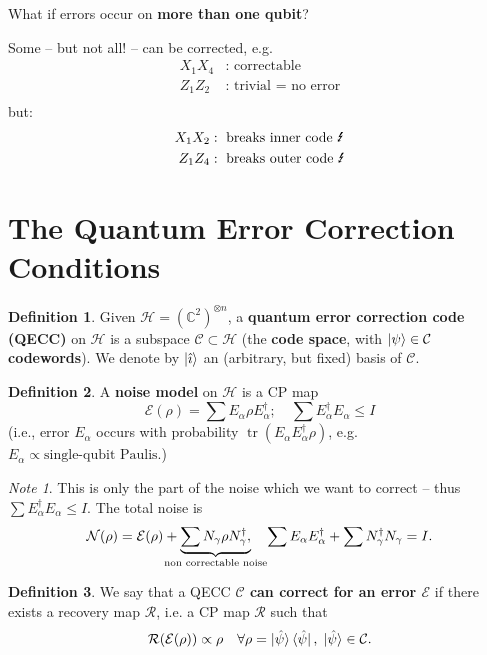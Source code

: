 \documentclass[a4paper, 12pt]{article}
\theoremstyle{plain}
\theoremstyle{definition}
\newtheorem*{definition}{Definition}
\theoremstyle{remark}
\newtheorem*{note}{Note}
\renewcommand{\H}{\mathcal{H}}
\newcommand{\C}{\mathbb{C}}
\DeclareMathOperator{\tr}{tr}
\begin{document}
What if errors occur on \textbf{more than one qubit}?

Some -- but not all! -- can be corrected, e.g.
\begin{align*}
  X_1 X_4&: \text{ correctable} \\
  Z_1 Z_2&: \text{ trivial = no error} \\
\end{align*}
but:
\begin{align*}
  X_1 X_2&: \text{ breaks inner code \Lightning}\\
  Z_1 Z_4&: \text{ breaks outer code \Lightning}
\end{align*}

\section{The Quantum Error Correction Conditions}
\begin{definition}
  Given $\H = (\C^2)^{\otimes n}$, a \textbf{quantum error correction code (QECC)} on $\H$ is a subspace $\mathcal{C} \subset \H$ (the \textbf{code space}, with $\ket{\psi} \in \mathcal{C}$ \textbf{codewords}). We denote by $\ket{\hat{\imath}}$ an (arbitrary, but fixed) basis of $\mathcal{C}$.
\end{definition}

\begin{definition}
  A \textbf{noise model} on $\H$ is a CP map
  \[
    \mathcal{E}(\rho) = \sum E_\alpha \rho E_\alpha^\dagger; \quad \sum E_\alpha^\dagger E_\alpha \leq I
  \]
  (i.e., error $E_\alpha$ occurs with probability $\tr(E_\alpha E_\alpha^\dagger \rho )$, e.g. $E_\alpha \propto \text{single-qubit Paulis}$.)
\end{definition}

\begin{note}
  This is only the part of the noise which we want to correct -- thus $\sum E_\alpha^\dagger E_\alpha \leq I$. The total noise is
  \[
    \mathcal{N}(\rho) = \mathcal{E}(\rho) + \underbrace{\sum N_\gamma \rho N_\gamma^\dagger,}_{\mathclap{\text{non correctable noise}}} \quad \sum E_\alpha E_\alpha^\dagger + \sum N_\gamma^\dagger N_\gamma = I.
  \]
\end{note}

\begin{definition}
  We say that a QECC \textbf{$\mathcal{C}$ can correct for an error $\mathcal{E}$} if there exists a recovery map $\mathcal{R}$, i.e. a CP map $\mathcal{R}$ such that
  \[
    \mathcal{R}(\mathcal{E}(\rho)) \propto \rho \quad \forall \rho = \ket{\hat{\psi}}\bra{\hat{\psi}},\; \ket{\hat{\psi}}\in\mathcal{C}.
  \]
\end{definition}
\end{document}

